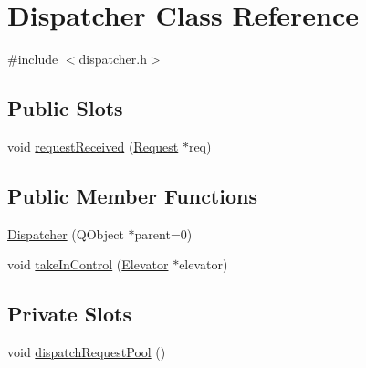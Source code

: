 \hypertarget{class_dispatcher}{
\section{Dispatcher Class Reference}
\label{class_dispatcher}
}


{\ttfamily \#include $<$dispatcher.h$>$}

\subsection*{Public Slots}
\begin{DoxyCompactItemize}
\item 
void \hyperlink{class_dispatcher_a5fd444604d8eadaafac5791f9947f021}{requestReceived} (\hyperlink{class_request}{Request} $\ast$req)
\end{DoxyCompactItemize}
\subsection*{Public Member Functions}
\begin{DoxyCompactItemize}
\item 
\hyperlink{class_dispatcher_aa97cd04e05de526ce5d7f5bdba572f23}{Dispatcher} (QObject $\ast$parent=0)
\item 
void \hyperlink{class_dispatcher_a95437a6831a0f727a64d8490cf65a49f}{takeInControl} (\hyperlink{class_elevator}{Elevator} $\ast$elevator)
\end{DoxyCompactItemize}
\subsection*{Private Slots}
\begin{DoxyCompactItemize}
\item 
void \hyperlink{class_dispatcher_a5472cf1335843f5fa4655519b0e0bd94}{dispatchRequestPool} ()
\end{DoxyCompactItemize}
